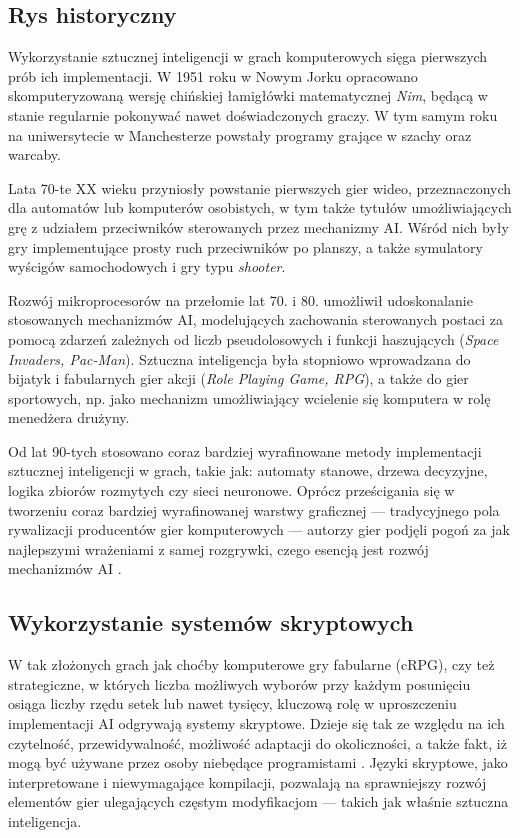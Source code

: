 \subsection*{Rys historyczny}
Wykorzystanie sztucznej inteligencji w grach komputerowych sięga pierwszych prób ich implementacji. W 1951 roku w Nowym Jorku opracowano skomputeryzowaną wersję chińskiej łamigłówki matematycznej \textit{Nim}, będącą w stanie regularnie pokonywać nawet doświadczonych graczy. W tym samym roku na uniwersytecie w Manchesterze powstały programy grające w szachy oraz warcaby. \iffalse{odniesienie do: http://www.newyorker.com/magazine/1952/08/02/it}\fi 

Lata 70-te XX wieku przyniosły powstanie pierwszych gier wideo, przeznaczonych dla automatów lub komputerów osobistych, w tym także tytułów umożliwiających grę z udziałem przeciwników sterowanych przez mechanizmy AI. Wśród nich były gry implementujące prosty ruch przeciwników po planszy, a także symulatory wyścigów samochodowych i gry typu \textit{shooter}.

Rozwój mikroprocesorów na przełomie lat 70. i 80. umożliwił udoskonalanie stosowanych mechanizmów AI, modelujących zachowania sterowanych postaci za pomocą zdarzeń zależnych od liczb pseudolosowych i funkcji haszujących (\textit{Space Invaders, Pac-Man}). Sztuczna inteligencja była stopniowo wprowadzana do bijatyk i fabularnych gier akcji (\textit{Role Playing Game, RPG}), a także do gier sportowych, np. jako mechanizm umożliwiający wcielenie się komputera w rolę menedżera drużyny.

Od lat 90-tych stosowano coraz bardziej wyrafinowane metody implementacji sztucznej inteligencji w grach, takie jak: automaty stanowe, drzewa decyzyjne, logika zbiorów rozmytych czy sieci neuronowe. Oprócz prześcigania się w tworzeniu coraz bardziej wyrafinowanej warstwy graficznej --- tradycyjnego pola rywalizacji producentów gier komputerowych --- autorzy gier podjęli pogoń za jak najlepszymi wrażeniami z samej rozgrywki, czego esencją jest rozwój mechanizmów AI \cite{adaptiveai}.

\subsection*{Wykorzystanie systemów skryptowych}

W tak złożonych grach jak choćby komputerowe gry fabularne (cRPG), czy też strategiczne, w których liczba możliwych wyborów przy każdym posunięciu osiąga liczby rzędu setek lub nawet tysięcy, kluczową rolę w uproszczeniu implementacji AI odgrywają systemy skryptowe. Dzieje się tak ze względu na ich czytelność, przewidywalność, możliwość adaptacji do okoliczności, a także fakt, iż mogą być używane przez osoby niebędące programistami \cite{adaptiveai}. Języki skryptowe, jako interpretowane i niewymagające kompilacji, pozwalają na sprawniejszy rozwój elementów gier ulegających częstym modyfikacjom --- takich jak właśnie sztuczna inteligencja.

